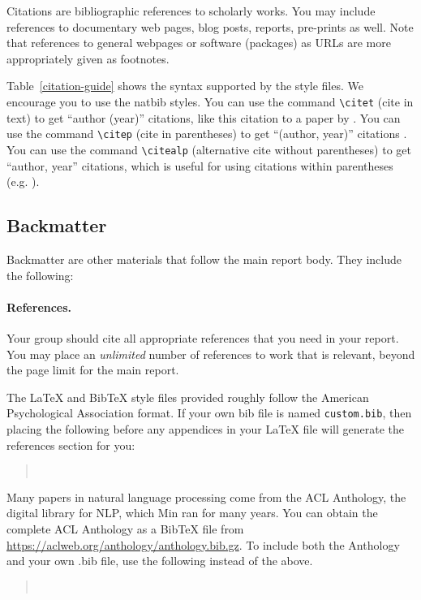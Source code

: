 \documentclass[11pt]{article}
\begin{document}
Citations are bibliographic references to scholarly works.  You may include references to documentary web pages, blog posts, reports, pre-prints as well.  Note that references to general webpages or software (packages) as URLs are more appropriately given as footnotes.

Table~\ref{citation-guide} shows the syntax supported by the style files.
We encourage you to use the natbib styles.
You can use the command \verb|\citet| (cite in text) to get ``author (year)'' citations, like this citation to a paper by \citet{Gusfield:97}.
You can use the command \verb|\citep| (cite in parentheses) to get ``(author, year)'' citations \citep{Gusfield:97}.
You can use the command \verb|\citealp| (alternative cite without parentheses) to get ``author, year'' citations, which is useful for using citations within parentheses (e.g. \citealp{Gusfield:97}).

\subsection{Backmatter}

Backmatter are other materials that follow the main report body.  They include the following:

\paragraph{References.} Your group should cite all appropriate references that you need in your report.  You may place an {\it unlimited} number of references to work that is relevant, beyond the page limit for the main report.
\nocite{Ando2005,borschinger-johnson-2011-particle,andrew2007scalable,rasooli-tetrault-2015,goodman-etal-2016-noise,harper-2014-learning}

The \LaTeX{} and Bib\TeX{} style files provided roughly follow the American Psychological Association format.
If your own bib file is named \texttt{custom.bib}, then placing the following before any appendices in your \LaTeX{} file will generate the references section for you:
\begin{quote}
\begin{verbatim}


\end{verbatim}
\end{quote}

Many papers in natural language processing come from the ACL Anthology, the digital library for NLP, which Min ran for many years.  You can obtain the complete ACL Anthology as a Bib\TeX{} file from \url{https://aclweb.org/anthology/anthology.bib.gz}.
To include both the Anthology and your own .bib file, use the following instead of the above.
\begin{quote}
\begin{verbatim}


\end{verbatim}
\end{quote}
\end{document}
